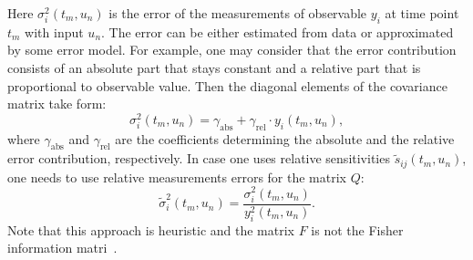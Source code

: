 \documentclass[10pt,A4paper]{article}
\begin{document}
Here $\sigma_{i}^2 (t_m, u_n)$ is the error of the measurements of observable $y_i$ at time point $t_m$ with input $u_n$.
The error can be either estimated from data or approximated by some error model.
For example, one may consider that the error contribution consists of an absolute part that stays constant and a relative part that is proportional to observable value.
Then the diagonal elements of the covariance matrix take form:
\begin{equation}
\label{eq:error_model}
    \sigma_{i}^2 (t_m, u_n) = \gamma_\text{abs} + \gamma_\text{rel} \cdot y_i(t_m, u_n),
\end{equation}
where $\gamma_\text{abs}$ and $\gamma_\text{rel}$ are the coefficients determining the absolute and the relative error contribution, respectively.
In case one uses relative sensitivities $\tilde{s}_{ij} (t_m, u_n)$, one needs to use relative measurements errors for the matrix $Q$:
\begin{equation}
    \tilde{\sigma}_{i}^2 (t_m, u_n) = \frac{\sigma_{i}^2 (t_m, u_n)}{y^2_i(t_m, u_n)}.
\end{equation} 
Note that this approach is heuristic and the matrix $F$ is not the Fisher information matri~\cite{versyckIntroducingOptimal1999, banks_generalized_2010}.
%
\end{document}
